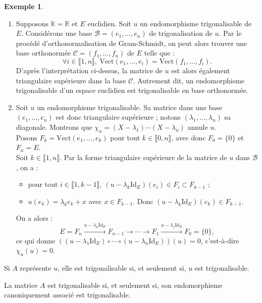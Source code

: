 \documentclass[french]{article}
\newcommand{\R}{\mathbb{R}}
\newcommand{\K}{\mathbb{K}}
\newcommand{\Vect}{\text{Vect}}
\newcommand{\Id}{\text{Id}}
\theoremstyle{plain}
\theoremstyle{definition}
\newtheorem*{ex}{Exemple}
\theoremstyle{remark}
\begin{document}
	\begin{ex}
		\begin{enumerate}
			\item Supposons $\K=\R$ et $E$ euclidien. Soit $u$ un endomorphisme trigonalisable de $E$. Considérons une base $\mathcal{B}=(e_1,\ldots,e_n)$ de trigonalisation de $u$. Par le procédé d'orthonormalisation de Gram-Schmidt, on peut alors trouver une base orthonormée $\mathcal{C}=(f_1,\ldots,f_n)$ de $E$ telle que :
			$$\forall i\in\llbracket1,n\rrbracket,\ \Vect(e_1,\ldots,e_i)=\Vect(f_1,\ldots,f_i).$$ D'après l'interprétation ci-dessus, la matrice de $u$ est alors également triangulaire supérieure dans la base $\mathcal{C}$. Autrement dit, un endomorphisme trigonalisable d'un espace euclidien est trigonalisable en base orthonormée.
			\item Soit $u$ un endomorphisme trigonalisable. Sa matrice dans une base $(e_1,\ldots,e_n)$ est donc triangulaire supérieure ; notons $(\lambda_1,\ldots,\lambda_n)$ sa diagonale. Montrons que $\chi_u=(X-\lambda_1)\cdots(X-\lambda_n)$ annule $u$.\\
			Posons $F_k=\Vect(e_1,\ldots,e_k)$ pour tout $k\in\llbracket0,n\rrbracket$, avec donc $F_0=\{0\}$ et $F_n=E$.\\
			Soit $k\in\llbracket1,n\rrbracket$. Par la forme triangulaire supérieure de la matrice de $u$ dans $\mathcal{B}$, on a :
			\begin{itemize}
				\item pour tout $i\in\llbracket1,k-1\rrbracket,\ (u-\lambda_k\Id_E)(e_i)\in F_i\subset F_{k-1}$ ;
				\item $u(e_k)=\lambda_k e_k+x$ avec $x\in F_{k-1}$. Donc $(u-\lambda_k\Id_E)(e_k)\in F_{k-1}$.
			\end{itemize}
			On a alors : $$E=F_n\xrightarrow{u-\lambda_n\Id_E}F_{n-1}\xrightarrow{}\cdots\xrightarrow{}F_1\xrightarrow{u-\lambda_1\Id_E}F_0=\{0\},$$ ce qui donne $((u-\lambda_1\Id_E)\circ\cdots\circ(u-\lambda_n\Id_E))(u)=0$, c'est-à-dire $\chi_u(u)=0$.
		\end{enumerate}
	\end{ex}
	
	\begin{prop}%
		Si $A$ représente $u$, elle est trigonalisable si, et seulement si, $u$ est trigonalisable.
	\end{prop}
	
	\begin{cor}%
		La matrice $A$ est trigonalisable si, et seulement si, son endomorphisme canoniquement associé est trigonalisable.
	\end{cor}
	
\end{document}

